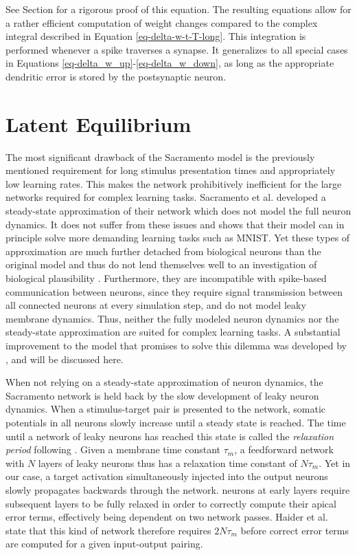 See Section  for a rigorous proof of this equation. The resulting equations allow for a rather efficient
computation of weight changes compared to the complex integral described in Equation \ref{eq-delta-w-t-T-long}. This
integration is performed whenever a spike traverses a synapse. It generalizes to all special cases in Equations
\ref{eq-delta_w_up}-\ref{eq-delta_w_down}, as long as the appropriate dendritic error is stored by the postsynaptic
neuron.

\section{Latent Equilibrium}\label{sec-haider}

The most significant drawback of the Sacramento model is the previously mentioned requirement for long stimulus
presentation times and appropriately low learning rates. This makes the network prohibitively inefficient for the large
networks required for complex learning tasks. Sacramento et al. developed a steady-state approximation of their network
which does not model the full neuron dynamics. It does not suffer from these issues and shows that their model can in
principle solve more demanding learning tasks such as MNIST. Yet these types of approximation are much further detached
from biological neurons than the original model and thus do not lend themselves well to an investigation of biological
plausibility \citep{Gerstner2009}. Furthermore, they are incompatible with spike-based communication between neurons,
since they require signal transmission between all connected neurons at every simulation step, and do not model leaky
membrane dynamics. Thus, neither the fully modeled neuron dynamics nor the steady-state approximation are suited for
complex learning tasks. A substantial improvement to the model that promises to solve this dilemma was developed by
\cite{Haider2021}, and will be discussed here.
\newline

When not relying on a steady-state approximation of neuron dynamics, the Sacramento network is held back by the slow
development of leaky neuron dynamics. When a stimulus-target pair is presented to the network, somatic potentials in all
neurons slowly increase until a steady state is reached. The time until a network of leaky neurons has reached this
state is called the \textit{relaxation period} following \cite{Haider2021}. Given a membrane time constant $\tau_m$, a
feedforward network with $N$ layers of leaky neurons thus has a relaxation time constant of $N \tau_m$. Yet in our case,
a target activation simultaneously injected into the output neurons slowly propagates backwards through the network.
neurons at early layers require subsequent layers to be fully relaxed in order to correctly compute their apical error
terms, effectively being dependent on two network passes. Haider et al. state that this kind of network therefore
requires $2N\tau_m$ before correct error terms are computed for a given input-output pairing.

